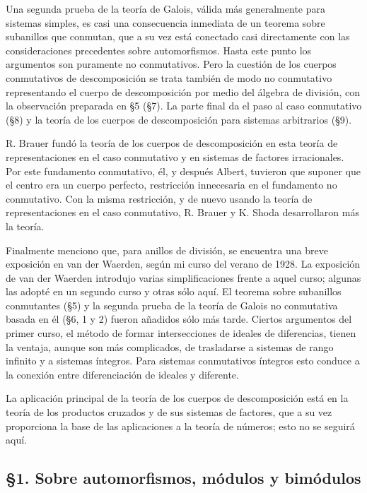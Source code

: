 Una segunda prueba de la teoría de Galois, válida más generalmente para sistemas simples, es casi una consecuencia inmediata de un teorema sobre subanillos que conmutan, que a su vez está conectado casi directamente con las consideraciones precedentes sobre automorfismos. Hasta este punto los argumentos son puramente no conmutativos. Pero la cuestión de los cuerpos conmutativos de descomposición se trata también de modo no conmutativo representando el cuerpo de descomposición por medio del álgebra de división, con la observación preparada en §5 (§7). La parte final da el paso al caso conmutativo (§8) y la teoría de los cuerpos de descomposición para sistemas arbitrarios (§9).

R. Brauer fundó la teoría de los cuerpos de descomposición en esta teoría de representaciones en el caso conmutativo y en sistemas de factores irracionales. Por este fundamento conmutativo, él, y después Albert, tuvieron que suponer que el centro era un cuerpo perfecto, restricción innecesaria en el fundamento no conmutativo. Con la misma restricción, y de nuevo usando la teoría de representaciones en el caso conmutativo, R. Brauer y K. Shoda desarrollaron más la teoría.

Finalmente menciono que, para anillos de división, se encuentra una breve exposición en van der Waerden, según mi curso del verano de 1928. La exposición de van der Waerden introdujo varias simplificaciones frente a aquel curso; algunas las adopté en un segundo curso y otras sólo aquí. El teorema sobre subanillos conmutantes (§5) y la segunda prueba de la teoría de Galois no conmutativa basada en él (§6, 1 y 2) fueron añadidos sólo más tarde. Ciertos argumentos del primer curso, el método de formar intersecciones de ideales de diferencias, tienen la ventaja, aunque son más complicados, de trasladarse a sistemas de rango infinito y a sistemas íntegros. Para sistemas conmutativos íntegros esto conduce a la conexión entre diferenciación de ideales y diferente.

La aplicación principal de la teoría de los cuerpos de descomposición está en la teoría de los productos cruzados y de sus sistemas de factores, que a su vez proporciona la base de las aplicaciones a la teoría de números; esto no se seguirá aquí.

\subsection*{§1. Sobre automorfismos, módulos y bimódulos}

